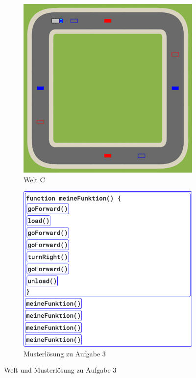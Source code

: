 \begin{figure}[H]
  \begin{subfigure}[b]{0.40\textwidth}
    \includegraphics[width=\textwidth]{gfx/exercises-world-c.png}
    \caption{Welt C}
  \end{subfigure}\hfill
  \begin{subfigure}[b]{0.40\textwidth}
    \includegraphics[width=\textwidth]{gfx/exercises-program-3.png}
    \caption{Musterlösung zu Aufgabe 3}
  \end{subfigure}\hfill
  \caption{Welt und Musterlösung zu Aufgabe 3}
\end{figure}

